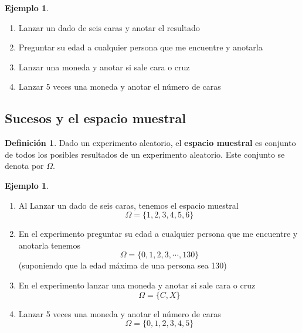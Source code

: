 \documentclass[]{article}
\theoremstyle{plain}
\theoremstyle{definition}
\newtheorem{definition}[theorem]{Definición}
\newtheorem{example}[theorem]{Ejemplo}
\begin{document}
\begin{example}
\begin{enumerate}
    \item Lanzar un dado de seis caras y anotar el resultado
    \item Preguntar su edad a cualquier persona que me encuentre y anotarla
    \item Lanzar una moneda y anotar si sale cara o cruz
    \item Lanzar 5 veces una moneda y anotar el número de caras
\end{enumerate}
\end{example}


\subsection*{Sucesos y el espacio muestral}

\begin{definition}
   Dado un experimento aleatorio, el \textbf{espacio muestral}  es 
   conjunto de todos los posibles resultados de un experimento aleatorio. Este conjunto se denota 
   por $\Omega$.
\end{definition}

\begin{example}
        \begin{enumerate}
            \item Al Lanzar un dado de seis caras, tenemos el espacio muestral 
            \[\Omega = \{1, 2, 3, 4, 5, 6\}\]
            \item En el experimento preguntar su edad a cualquier persona que me encuentre y anotarla tenemos
            \[\Omega = \{0,1, 2, 3,\cdots, 130\}\]
            (suponiendo que la edad máxima de una persona sea 130)
            \item En el experimento lanzar una moneda y anotar si sale cara o cruz
            \[\Omega = \{C, X\}\]
            \item Lanzar 5 veces una moneda y anotar el número de caras
            \[\Omega = \{0, 1, 2, 3, 4, 5\}\]
        \end{enumerate}
\end{example}
\end{document}
